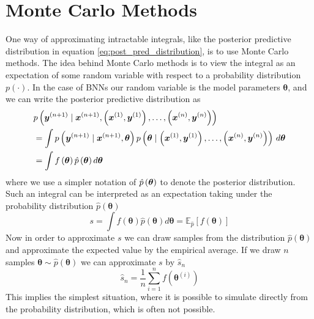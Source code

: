 \section{Monte Carlo Methods}\label{sec:MC_methods}
One way of approximating intractable integrals, like the posterior predictive distribution in equation \ref{eq:post_pred_distribution}, is to use Monte Carlo methods. The idea behind Monte Carlo methods is to view the integral as an expectation of some random variable with respect to a probability distribution $p(\cdot)$. In the case of BNNs our random variable is the model parameters $\boldsymbol{\theta}$, and we can write the posterior predictive distribution as
\begin{equation}
    \begin{split}
        &p\left(\boldsymbol{y}^{(n+1)} \mid \boldsymbol{x}^{(n+1)}, \left (\boldsymbol{x}^{(1)},\boldsymbol{y}^{(1)}\right), \ldots, \left (\boldsymbol{x}^{(n)}, \boldsymbol{y}^{(n)}\right)\right)\\
        &=\int p\left(\boldsymbol{y}^{(n+1)} \mid \boldsymbol{x}^{(n+1)}, \boldsymbol{\theta}\right) p \left (\boldsymbol{\theta} \mid \left (\boldsymbol{x}^{(1)}, \boldsymbol{y}^{(1)}\right), \ldots, \left (\boldsymbol{x}^{(n)}, \boldsymbol{y}^{(n)}\right)\right) \, d \boldsymbol{\theta}\\
        &=\int f\left (\boldsymbol{\theta}\right)\hat{p}\left (\boldsymbol{\theta}\right) d\boldsymbol{\theta}
    \end{split}
\end{equation}
where we use a simpler notation of $\hat{p}\left (\boldsymbol{\theta}\right)$ to denote the posterior distribution. Such an integral can be interpreted as an expectation taking under the probability distribution $\hat{p}(\boldsymbol{\theta})$ 
\begin{equation*}
    s=\int f(\boldsymbol{\theta})\hat{p}(\boldsymbol{\theta})  d \boldsymbol{\theta}=\mathbb{E}_{\hat{p}}[f(\boldsymbol{\theta})]
\end{equation*}
Now in order to approximate $s$ we can draw samples from the distribution $\hat{p}(\boldsymbol{\theta}) $ and approximate the expected value by the empirical average. If we draw $n$ samples $\boldsymbol{\theta}\sim \hat{p}(\boldsymbol{\theta})$ we can approximate $s$ by $\hat{s}_n$
\begin{equation}\label{eq:empirical_mean_MC}
        \hat{s}_{n}=\frac{1}{n} \sum_{i=1}^{n} f\left(\boldsymbol{\theta}^{(i)}\right)
\end{equation}
This implies the simplest situation, where it is possible to simulate directly from the probability distribution, which is often not possible.
